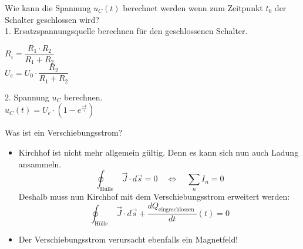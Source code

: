 \begin{karte}{Wie kann die Spannung $u_C(t)$ berechnet werden wenn zum Zeitpunkt $t_0$ der Schalter geschlossen wird?\\[10pt] }
	1. Ersatzspannungsquelle berechnen für den geschlossenen Schalter.\\
	\begin{minipage}{0.6\textwidth}
		
	\end{minipage}
	\begin{minipage}{0.4\textwidth}
		$R_i = \dfrac{R_1\cdot R_2}{R_1+R_2}$\\[5pt]
		$U_e = U_0 \cdot \dfrac{R_2}{R_1 + R_2}$
	\end{minipage}
	2. Spannung $u_C$ berechnen.\\
	$ u_C(t)= U_e \cdot \left(1-e^{\frac{-t}{\tau}}\right)$

\end{karte}

\begin{karte}{Was ist ein Verschiebungsstrom?}
	\begin{center}
		\begin{itemize}
			\item 	Kirchhof ist nicht mehr allgemein gültig. Denn es kann sich nun auch Ladung ansammeln.\\
			\begin{equation*}
			\displaystyle \oint_{\text {Hülle }} \vec{J} \cdot d \vec{s}=0 \quad \Leftrightarrow \quad  \sum_{n} I_{n}=0
			\end{equation*}
			Deshalb muss nun Kirchhof mit dem Verschiebungsstrom erweitert werden:\\
			\begin{equation*}
			\displaystyle \oint_{\text {Hülle }} \vec{J} \cdot d \vec{s}+\frac{d Q_{\text {eingeschlossen }}}{d t}(t)=0
			\end{equation*}
			\item Der Verschiebungsstrom verursacht ebenfalls ein Magnetfeld!
		\end{itemize}
	\end{center}
\end{karte}	



